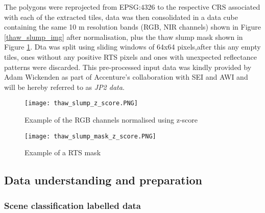 The polygons were reprojected from \gls{EPSG}:$4326$ to the respective \gls{CRS} associated with each of the extracted tiles, data was then consolidated in a data cube containing the same 10 m resolution bands (\gls{RGB}, \gls{NIR} channels)  shown in Figure \ref{thaw_slump_img} after normalisation, plus the thaw slump mask shown in Figure \ref{thaw_slump_mask}. Dta was split using sliding windows of 64x64 pixels,after this any empty tiles, ones without any positive \gls{RTS} pixels and ones with unexpected reflectance patterns were discarded. This pre-processed input data was kindly provided by Adam Wickenden as part of Accenture's collaboration  with \gls{SEI} and \gls{AWI} and will be hereby referred to as \textit{\gls{JP2} data}.

\begin{figure}[hbt!]
    \begin{minipage}[c]{0.45\linewidth}
        \texttt{[image: thaw\_slump\_z\_score.PNG]}
        \caption{Example of the \gls{RGB} channels normalised using z-score}
        \label{thaw_slump_img}        
        \end{minipage}
        \hfill
        \begin{minipage}[c]{0.45\linewidth}
        \texttt{[image: thaw\_slump\_mask\_z\_score.PNG]}
        \caption{Example of a \gls{RTS} mask}
        \label{thaw_slump_mask}
    \end{minipage}
\end{figure}

\subsection{Data understanding and preparation} \label{dataprep}
\subsubsection{Scene classification labelled data}
